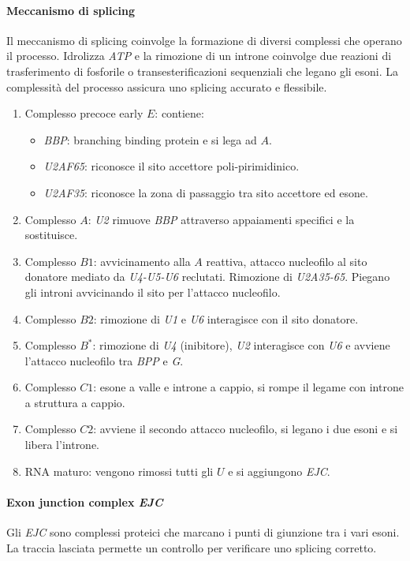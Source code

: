			\paragraph{Meccanismo di splicing}
			Il meccanismo di splicing coinvolge la formazione di diversi complessi che operano il processo.
			Idrolizza \emph{ATP} e la rimozione di un introne coinvolge due reazioni di trasferimento di fosforile o transesterificazioni sequenziali che legano gli esoni.
			La complessit\`a del processo assicura uno splicing accurato e flessibile.
			\begin{multicols}{2}
				\begin{enumerate}
					\item Complesso precoce early $E$: contiene:
						\begin{itemize}
							\item \emph{BBP}: branching binding protein e si lega ad $A$.
							\item \emph{U2AF65}: riconosce il sito accettore poli-pirimidinico.
							\item \emph{U2AF35}: riconosce la zona di passaggio tra sito accettore ed esone.
						\end{itemize}
					\item Complesso $A$: \emph{U2} rimuove \emph{BBP} attraverso appaiamenti specifici e la sostituisce.
					\item Complesso $B1$: avvicinamento alla $A$ reattiva, attacco nucleofilo al sito donatore mediato da \emph{U4-U5-U6} reclutati.
						Rimozione di \emph{U2A35-65}.
						Piegano gli introni avvicinando il sito per l'attacco nucleofilo.
					\item Complesso $B2$: rimozione di \emph{U1} e \emph{U6} interagisce con il sito donatore.
					\item Complesso $B^*$: rimozione di \emph{U4} (inibitore), \emph{U2} interagisce con \emph{U6} e avviene l'attacco nucleofilo tra \emph{BPP} e \emph{G}.
					\item Complesso $C1$: esone a valle e introne a cappio, si rompe il legame con introne a struttura a cappio.
					\item Complesso $C2$: avviene il secondo attacco nucleofilo, si legano i due esoni e si libera l'introne.
					\item RNA maturo: vengono rimossi tutti gli $U$ e si aggiungono \emph{EJC}.
				\end{enumerate}
			\end{multicols}

			\paragraph{Exon junction complex \emph{EJC}}
			Gli \emph{EJC} sono complessi proteici che marcano i punti di giunzione tra i vari esoni.
			La traccia lasciata permette un controllo per verificare uno splicing corretto.


